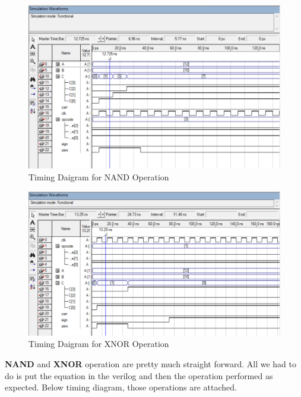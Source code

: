 \begin{figure}[h]
    \begin{center}
        \includegraphics[scale=0.2]{figures/nand}
    \end{center}
    \caption{Timing Daigram for NAND Operation}
    \label{fig:timing nand}
\end{figure}

\begin{figure}[h]
    \begin{center}
        \includegraphics[scale=0.2]{figures/xnor}
    \end{center}
    \caption{Timing Daigram for XNOR Operation}
    \label{fig:timing xnor}
\end{figure}

\textbf{NAND} and \textbf{XNOR} operation are pretty much straight forward.
All we had to do is put the equation in the verilog and then the
operation performed as expected.
Below timing diagram, those operations are attached.
